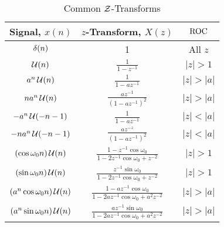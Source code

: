 \begin{table}[h!]
  \centering
  \renewcommand{\arraystretch}{1.4}
  \begin{tabular}{ccc}
    \toprule
    Signal, $x(n)$ & $z$-Transform, $X(z)$ & $\operatorname{\mathrm{ROC}}$ \\
    \midrule
    $\operatorname{\delta}(n)$ & 1 & All $z$ \\
    $\operatorname{\mathcal{U}}(n)$ & $\frac{1}{1-z^{-1}}$ & $\lvert z \rvert > 1$ \\
    $a^{n}\operatorname{\mathcal{U}}(n)$ & $\frac{1}{1-az^{-1}}$ & $\lvert z \rvert > \lvert a \rvert$ \\
    $na^{n}\operatorname{\mathcal{U}}(n)$ & $\frac{az^{-1}}{{\left( 1-az^{-1} \right)}^{2}}$ & $\lvert z \rvert > \lvert a \rvert$ \\
    $-a^{n}\operatorname{\mathcal{U}}(-n-1)$ & $\frac{1}{1-az^{-1}}$ & $\lvert z \rvert < \lvert a \rvert$ \\
    $-na^{n}\operatorname{\mathcal{U}}(-n-1)$ & $\frac{az^{-z}}{{\left( 1-az^{-1} \right)}^{2}}$ & $\lvert z \rvert < \lvert a \rvert$ \\
    $\left( \cos \omega_{0}n \right) \operatorname{\mathcal{U}}(n)$ & $\frac{1-z^{-1}\cos \omega_{0}}{1-2z^{-1}\cos \omega_{0} + z^{-2}}$ & $\lvert z \rvert > 1$ \\
    $\left( \sin \omega_{0}n \right) \operatorname{\mathcal{U}}(n)$ & $\frac{z^{-1}\sin \omega_{0}}{1-2z^{-1}\cos \omega_{0} + z^{-2}}$ & $\lvert z \rvert > 1$ \\
    $\left( a^{n} \cos \omega_{0}n \right) \operatorname{\mathcal{U}}(n)$ & $\frac{1-az^{-1}\cos \omega_{0}}{1-2az^{-1} \cos \omega_{0} + a^{2}z^{-2}}$ & $\lvert z \rvert > \lvert a \rvert$ \\
        $\left( a^{n} \sin \omega_{0}n \right) \operatorname{\mathcal{U}}(n)$ & $\frac{az^{-1}\sin \omega_{0}}{1-2az^{-1} \cos \omega_{0} + a^{2}z^{-2}}$ & $\lvert z \rvert > \lvert a \rvert$ \\
    \bottomrule
  \end{tabular}
  \caption{Common $\operatorname{\mathcal{Z}}$-Transforms}
  \label{tab:Common Z-Transforms}
\end{table}


